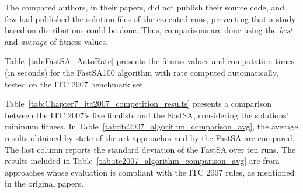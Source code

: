 The compared authors, in their papers, did not publish their source code, and few had published the solution files of the executed runs, preventing that a study based on distributions could be done. Thus, comparisons are done using the \textit{best} and \textit{average} of fitness values.

Table~\ref{tab:FastSA_AutoRate} presents the fitness values and computation times (in seconds) for the FastSA100 algorithm with rate computed automatically, tested on the ITC 2007 benchmark set.


Table~\ref{tab:Chapter7_itc2007_competition_results} presents a comparison between the ITC 2007's five finalists and the FastSA, considering the solutions' minimum fitness. In Table~\ref{tab:itc2007_algorithm_comparison_avg}, the average results obtained by state-of-the-art approaches and by the FastSA are compared. The last column reports the standard deviation of the FastSA over ten runs. The results included in Table~\ref{tab:itc2007_algorithm_comparison_avg} are from approaches whose evaluation is compliant with the ITC 2007 rules, as mentioned in the original papers. 



